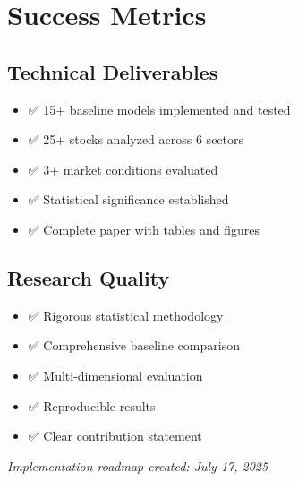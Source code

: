 \documentclass[11pt]{article}
\begin{document}
\section{Success Metrics}

\subsection{Technical Deliverables}
\begin{itemize}
    \item ✅ 15+ baseline models implemented and tested
    \item ✅ 25+ stocks analyzed across 6 sectors
    \item ✅ 3+ market conditions evaluated
    \item ✅ Statistical significance established
    \item ✅ Complete paper with tables and figures
\end{itemize}

\subsection{Research Quality}
\begin{itemize}
    \item ✅ Rigorous statistical methodology
    \item ✅ Comprehensive baseline comparison
    \item ✅ Multi-dimensional evaluation
    \item ✅ Reproducible results
    \item ✅ Clear contribution statement
\end{itemize}

\vfill
\begin{center}
\textit{Implementation roadmap created: July 17, 2025}
\end{center}
\end{document}
